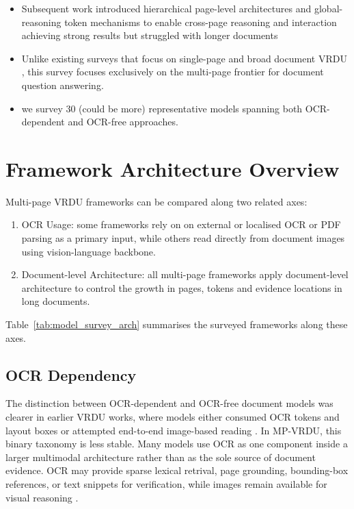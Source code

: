 \documentclass[11pt]{article}
\begin{document}
\begin{itemize}
    \item Subsequent work introduced hierarchical page-level architectures \cite{tito2023hierarchical} and global-reasoning token mechanisms \cite{blau2024gram} to enable cross-page reasoning and interaction achieving strong results but struggled with longer documents
    \item Unlike existing surveys that focus on single-page and broad document VRDU \cite{ding2025survey}, this survey focuses exclusively on the multi-page frontier for document question answering.
    \item we survey 30 (could be more) representative models spanning both OCR-dependent and OCR-free approaches.
\end{itemize}

\section{Framework Architecture Overview}
Multi-page VRDU frameworks can be compared along two related axes:
\begin{enumerate}
    \item OCR Usage: some frameworks rely on on external or localised OCR or PDF parsing as a primary input, while others read directly from document images using vision-language backbone.
    \item Document-level Architecture: all multi-page frameworks apply document-level architecture to control the growth in pages, tokens and evidence locations in long documents.
\end{enumerate}
Table~\ref{tab:model_survey_arch} summarises the surveyed frameworks along these axes.



\subsection{OCR Dependency}
The distinction between OCR-dependent and OCR-free document models was clearer in earlier VRDU works, where models either consumed OCR tokens and layout boxes or attempted end-to-end image-based reading \cite{huang2022layoutlmv3, ding2025survey}. In MP-VRDU, this binary taxonomy is less stable. Many models use OCR as one component inside a larger multimodal architecture rather than as the sole source of document evidence. OCR may provide sparse lexical retrival, page grounding, bounding-box references, or text snippets for verification, while images remain available for visual reasoning \cite{han2025mdocagent, zhu2025simple, wang2025vidorag}.
\end{document}
